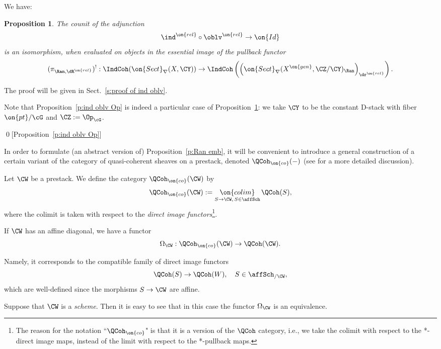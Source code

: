 \documentclass[9pt]{amsart}
\newtheorem{prop}[subsubsection]{Proposition}
\theoremstyle{remark}
\theoremstyle{definition}
\theoremstyle{remark}
\newcommand{\secref}[1]{Sect.~\ref{#1}}
\newcommand{\propref}[1]{Proposition~\ref{#1}}
\numberwithin{equation}{section}
\begin{document}
\medskip

We have:

\begin{prop} \label{p:ind oblv YZ}
The counit of the adjunction
$$\ind^{\on{rel}}\circ \oblv^{\on{rel}}\to \on{Id}$$
is an isomorphism, when evaluated on objects in the essential image of the pullback functor
$$(\pi_{\Ran,\dR^{\on{rel}}})^!:\IndCoh(\on{Sect}_\nabla(X,\CY))\to \IndCoh\left(\left(\on{Sect}_\nabla(X^{\on{gen}},\CZ/\CY)_\Ran\right)_{\dr^{\on{rel}}}\right).$$
\end{prop} 

The proof will be given in \secref{s:proof of ind oblv}. 

\sssec{}

Note that \propref{p:ind oblv Op} is indeed a particular case of \propref{p:ind oblv YZ}: we take $\CY$ to be the constant D-stack
with fiber $\on{pt}/\cG$ and $\CZ:=\Op_\cG$. 

\qed[\propref{p:ind oblv Op}]


In order to formulate (an abstract version of) \propref{p:Ran emb}, it will be convenient to introduce
a general construction of a certain variant of the category of quasi-coherent sheaves on a prestack,
denoted $\QCoh_{\on{co}}(-)$ (see \cite[Sect. A.1]{GLC2} for a more detailed discussion).

\sssec{} \label{sss:iQCoh prestack}

Let $\CW$ be a prestack. We define the category $\QCoh_{\on{co}}(\CW)$ by
$$\QCoh_{\on{co}}(\CW):= \underset{S\to \CW,\,S\in \affSch}{\on{colim}}\, \QCoh(S),$$
where the colimit is taken with respect to the \emph{direct image functors}\footnote{The reason for the notation 
``$\QCoh_{\on{co}}$" is that it is a version of the $\QCoh$ category, i.e., we take
the colimit with respect to the *-direct image maps, instead of the limit with respect to the *-pullback maps.}.

\sssec{}

If $\CW$ has an affine diagonal, we have a functor
$$\Omega_\CW: \QCoh_{\on{co}}(\CW)\to \QCoh(\CW).$$

Namely, it corresponds to the compatible family of direct image functors
$$\QCoh(S)\to \QCoh(W), \quad S\in \affSch_{/\CW},$$
which are well-defined since the morphisms $S\to \CW$ are affine. 


Suppose that $\CW$ is a \emph{scheme}. Then it is easy to see that in this case the functor $\Omega_\CW$
is an equivalence. 
\end{document}
